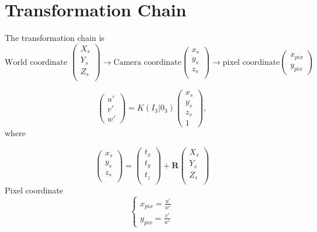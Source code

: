 \documentclass[a4paper, twoside, english]{article}
\newcommand{\br}{\textbf{R}}
\begin{document}
\section{Transformation Chain}
The transformation chain is 
	\[ \text{World coordinate } \left(
	\begin{array}{c}
		X_s \\
		Y_s \\
		Z_s\\
	\end{array}
	\right) 
	\rightarrow \text{Camera coordinate} 
	\left(
	\begin{array}{c}
		x_s \\
		y_s \\
		z_s\\
	\end{array}
	\right)
	\rightarrow 
		\text{pixel coordinate}
		\left(
		\begin{array}{c}
			x_{pix} \\
			y_{pix} 
		\end{array}
		\right)
	\]

\begin{equation*}
	\left(
	\begin{array}{c}
		u\prime \\
		v\prime \\
		w\prime
	\end{array}
	\right) = K(I_3 | 0_3)
	\left(
	\begin{array}{c}
		x_s \\
		y_s \\
		z_s\\
		1
	\end{array}
	\right)
	,
\end{equation*}
where

\begin{equation*}
	\left(
	\begin{array}{c}
		x_s \\
		y_s \\
		z_s\\
	\end{array}
	\right) = 
	\left(
	\begin{array}{c}
		t_x \\
		t_y \\
		t_z\\
	\end{array}
	\right) + \br 
	\left(
	\begin{array}{c}
		X_s \\
		Y_s \\
		Z_s\\
	\end{array}
	\right)
\end{equation*}
Pixel coordinate
\begin{equation*}
	\begin{cases}
		x_{pix} = \frac{u\prime}{w\prime}\\
		y_{pix} = \frac{v\prime}{w\prime}
	\end{cases}
\end{equation*}
\end{document}
